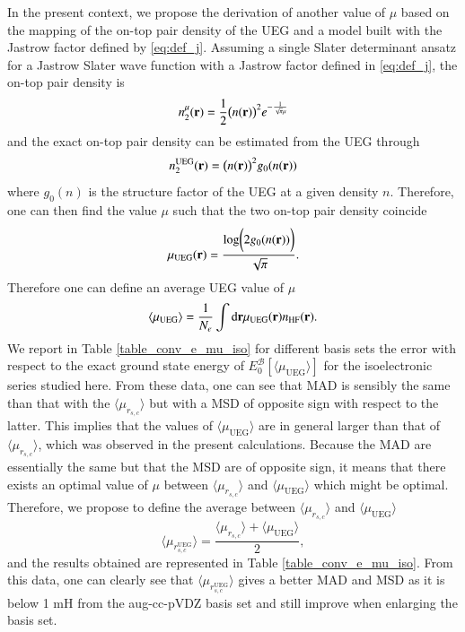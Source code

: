\documentclass[aip,jcp,reprint,noshowkeys,superscriptaddress]{revtex4-1}
\newcommand{\basis}[0]{\mathcal{B}}
\newcommand{\muueg}{\mu_{\text{UEG}}}
\newcommand{\muuegav}{\langle \mu_{\text{UEG}}\rangle}
\newcommand{\murscav}{\langle \mu_{r_{s,c}}\rangle}
\newcommand{\mursclda}{\langle \mu_{r_{s,c}^{\text{UEG}}}\rangle}
\begin{document}
In the present context, we propose the derivation of another value of $\mu$ based on the mapping of the on-top pair density of the UEG and a model built with the Jastrow factor defined by \eqref{eq:def_j}. 
Assuming a single Slater determinant ansatz for a Jastrow Slater wave function with a Jastrow factor defined in \eqref{eq:def_j}, the on-top pair density is 
\begin{equation}
 n_2^\mu({\bf r}) = \frac{1}{2}\big(n({\bf r})\big)^2 e^{-\frac{1}{\sqrt{\pi}\mu}}
\end{equation}
and the exact on-top pair density can be estimated from the UEG through 
\begin{equation}
 n_2^{\text{UEG}}({\bf r}) = \big(n({\bf r})\big)^2g_0(n({\bf r}))
\end{equation}
where $g_0( n)$ is the structure factor of the UEG at a given density $n$. 
Therefore, one can then find the value $\mu$ such that the two on-top pair density coincide
\begin{equation}
 \muueg({\bf r}) = \frac{\text{log}\bigg(2 g_0(n({\bf r}))\bigg) }{\sqrt{\pi}}.
\end{equation}
Therefore one can define an average UEG value of $\mu$ 
\begin{equation}
 \label{eq:mu_av_ueg}
 \muuegav = \frac{1}{N_e}\int \text{d}{\bf r} \muueg({\bf r}) n_{\text{HF}}({\bf r}).
\end{equation}
We report in Table \ref{table_conv_e_mu_iso} for different basis sets the error with respect to the exact ground state energy of $E_0^{\basis}[\muuegav]$ for the isoelectronic series studied here. 
From these data, one can see that MAD is sensibly the same than that with the $\murscav$ but with a MSD of opposite sign with respect to the latter. This implies that the values of $\muuegav$ are in general larger than that of $\murscav$, which was observed in the present calculations. 
Because the MAD are essentially the same but that the MSD are of opposite sign, it means that there exists an optimal value of $\mu$ between $\murscav$ and $\muuegav$ which might be optimal. 
Therefore, we propose to define the average between $\murscav$ and $\muuegav$ 
\begin{equation}
 \label{eq:mu_av_ueg_rsc}
  \mursclda = \frac{\murscav   +   \muuegav }{2},
\end{equation}
and the results obtained are represented in Table \ref{table_conv_e_mu_iso}. From this data, one can clearly see that $\mursclda$ gives a better MAD and MSD as it is below 1 mH from the aug-cc-pVDZ basis set and still improve when enlarging the basis set. 
\end{document}
